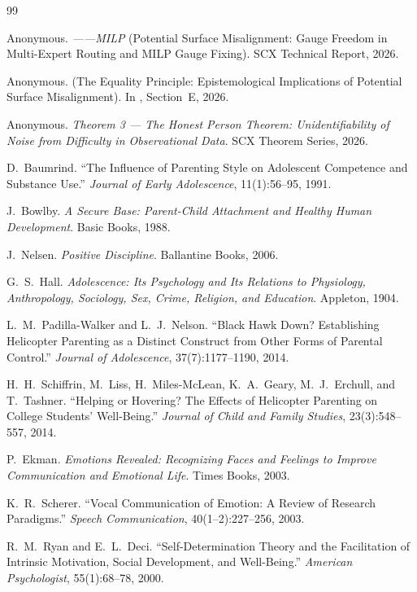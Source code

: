 \documentclass[11pt,a4paper]{article}
\begin{document}
\begin{thebibliography}{99}

Anonymous. \textit{——MILP} (Potential Surface Misalignment: Gauge Freedom in Multi-Expert Routing and MILP Gauge Fixing). SCX Technical Report, 2026.

Anonymous. \textit{} (The Equality Principle: Epistemological Implications of Potential Surface Misalignment). In \cite{scx_moe_gauge}, Section~E, 2026.

Anonymous. \textit{Theorem 3 — The Honest Person Theorem: Unidentifiability of Noise from Difficulty in Observational Data}. SCX Theorem Series, 2026.

D.~Baumrind. ``The Influence of Parenting Style on Adolescent Competence and Substance Use.'' \textit{Journal of Early Adolescence}, 11(1):56--95, 1991.

J.~Bowlby. \textit{A Secure Base: Parent-Child Attachment and Healthy Human Development}. Basic Books, 1988.

J.~Nelsen. \textit{Positive Discipline}. Ballantine Books, 2006.

G.~S.~Hall. \textit{Adolescence: Its Psychology and Its Relations to Physiology, Anthropology, Sociology, Sex, Crime, Religion, and Education}. Appleton, 1904.

L.~M.~Padilla-Walker and L.~J.~Nelson. ``Black Hawk Down? Establishing Helicopter Parenting as a Distinct Construct from Other Forms of Parental Control.'' \textit{Journal of Adolescence}, 37(7):1177--1190, 2014.

H.~H.~Schiffrin, M.~Liss, H.~Miles-McLean, K.~A.~Geary, M.~J.~Erchull, and T.~Tashner. ``Helping or Hovering? The Effects of Helicopter Parenting on College Students' Well-Being.'' \textit{Journal of Child and Family Studies}, 23(3):548--557, 2014.

P.~Ekman. \textit{Emotions Revealed: Recognizing Faces and Feelings to Improve Communication and Emotional Life}. Times Books, 2003.

K.~R.~Scherer. ``Vocal Communication of Emotion: A Review of Research Paradigms.'' \textit{Speech Communication}, 40(1--2):227--256, 2003.

R.~M.~Ryan and E.~L.~Deci. ``Self-Determination Theory and the Facilitation of Intrinsic Motivation, Social Development, and Well-Being.'' \textit{American Psychologist}, 55(1):68--78, 2000.


\end{thebibliography}
\end{document}
